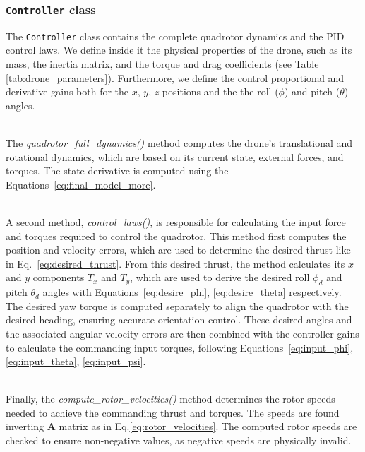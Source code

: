 \documentclass[main]{subfiles}
\begin{document}
\subsubsection{\texttt{Controller} class}
\label{sec:controller_class}
The \texttt{Controller} class contains the 
complete quadrotor dynamics and the PID control laws. 
We define inside it the physical properties of the drone, such as its mass, 
the inertia matrix, and the torque and drag coefficients (see Table \ref{tab:drone_parameters}).
Furthermore, we define the control proportional and derivative 
gains both for the $x$, $y$, $z$ positions and the 
the roll (\(\phi\)) and pitch (\(\theta\)) angles.

\noindent\\
The \textit{quadrotor\_full\_dynamics()} method computes 
the drone's translational and rotational dynamics, which are based on 
its current state, external forces, and torques. 
The state derivative is computed using the Equations~\ref{eq:final_model_more}.

\noindent\\
A second method, \textit{control\_laws()}, is responsible 
for calculating the input force and torques required 
to control the quadrotor. This method first computes 
the position and velocity errors, which are used to 
determine the desired thrust like in Eq.~\ref{eq:desired_thrust}. 
From this desired thrust, the method calculates its 
$x$ and $y$ components \(T_x\) and \(T_y\), 
which are used to derive the desired roll \(\phi_d\) 
and pitch \(\theta_d\) angles with Equations~\ref{eq:desire_phi}, 
\ref{eq:desire_theta} respectively. 
The desired yaw torque is computed separately 
to align the quadrotor with the desired heading, 
ensuring accurate orientation control. These desired angles and the 
associated angular velocity errors are then combined 
with the controller gains to calculate the commanding input torques,
following Equations~\ref{eq:input_phi}, \ref{eq:input_theta}, 
\ref{eq:input_psi}. 

\noindent\\
Finally, the \textit{compute\_rotor\_velocities()} 
method determines the rotor speeds needed to achieve 
the commanding thrust and torques. The speeds are found 
inverting $\mathbf{A}$ matrix as in Eq.\ref{eq:rotor_velocities}.
The computed rotor speeds are checked 
to ensure non-negative values, as negative speeds are 
physically invalid.
\end{document}
